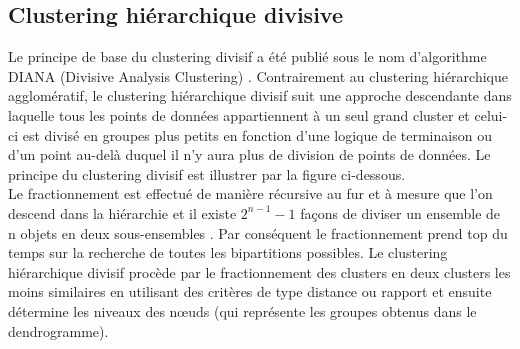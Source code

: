 \begin{figure}[H]
	\centering
    \qquad
\end{figure}


\subsection{Clustering hiérarchique divisive}
Le principe de base du clustering divisif a été publié sous le nom d'algorithme DIANA (Divisive Analysis Clustering) \cite{Finding_Groups_in_Data_An_Introduction_To_Cluster_Analysis}. Contrairement au clustering hiérarchique agglomératif, le clustering hiérarchique divisif suit une approche descendante dans laquelle tous les points de données appartiennent à un seul grand cluster et celui-ci est divisé en groupes plus petits en fonction d'une logique de terminaison ou d'un point au-delà duquel il n'y aura plus de division de points de données. Le principe du clustering divisif est illustrer par la figure ci-dessous. \\
Le fractionnement est effectué de manière récursive au fur et à mesure que l'on descend dans la hiérarchie et il existe \(\displaystyle 2^{n-1}-1 \)  façons de diviser un ensemble de n objets en deux sous-ensembles \cite{roux2018comparative}. Par conséquent le fractionnement prend top du temps sur la recherche de toutes les bipartitions possibles. Le clustering hiérarchique divisif procède par le fractionnement des clusters en deux clusters les moins similaires en utilisant des critères de type distance ou rapport et ensuite détermine les niveaux des nœuds (qui représente les groupes obtenus dans le dendrogramme).

